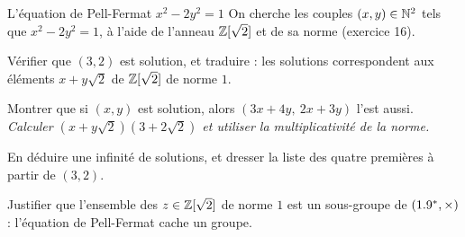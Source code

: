 \begin{exercice}[3]{L'équation de Pell-Fermat $x^{2}-2y^{2}=1$}
On cherche les couples $(x,y)\in\mathbb{N}^{2}$ tels que $x^{2}-2y^{2}=1$, à
l'aide de l'anneau $\mathbb{Z}[\sqrt2]$ et de sa norme (exercice 16).
\begin{questions}
  \item Vérifier que $(3,2)$ est solution, et traduire : les solutions
    correspondent aux éléments $x+y\sqrt2$ de $\mathbb{Z}[\sqrt2]$ de norme $1$.
  \item Montrer que si $(x,y)$ est solution, alors
    $(3x+4y,\ 2x+3y)$ l'est aussi.
    \emph{Calculer $(x+y\sqrt2)(3+2\sqrt2)$ et utiliser la
    multiplicativité de la norme.}
  \item En déduire une infinité de solutions, et dresser la liste des
    quatre premières à partir de $(3,2)$.
  \item Justifier que l'ensemble des $z\in\mathbb{Z}[\sqrt2]$ de norme $1$ est un
    sous-groupe de $(1.9^{*},\times)$ : l'équation de Pell-Fermat cache un
    groupe.
\end{questions}
\end{exercice}



